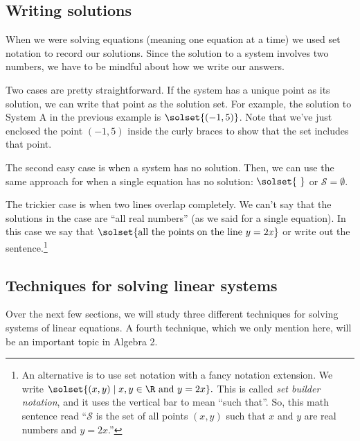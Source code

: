 \subsection{Writing solutions}

When we were solving equations (meaning one equation at a time) we used set notation to record our solutions. Since the solution to a system involves two numbers, we have to be mindful about how we write our answers.

Two cases are pretty straightforward. If the system has a unique point as its solution, we can write that point as the solution set. For example, the solution to System A in the previous example is $\solset{(-1,5)}$. Note that we've just enclosed the point $(-1,5)$ inside the curly braces to show that the set includes that point.

The second easy case is when a system has no solution. Then, we can use the same approach for when a single equation has no solution: $\solset{~}$ or $\mathcal{S}=\emptyset$.

The trickier case is when two lines overlap completely. We can't say that the solutions in the case are ``all real numbers'' (as we said for a single equation). In this case we say that $\solset{\text{all the points on the line }y=2x}$ or write out the sentence.\footnote{An alternative is to use set notation with a fancy notation extension. We write $\solset{(x,y) \mid x, y \in \R \text{ and } y=2x}.$ This is called \textit{set builder notation}, and it uses the vertical bar to mean ``such that''. So, this math sentence read ``$\mathcal{S}$ is the set of all points $(x,y)$ such that $x$ and $y$ are real numbers and $y=2x$.''}


\subsection{Techniques for solving linear systems}

Over the next few sections, we will study three different techniques for solving systems of linear equations. A fourth technique, which we only mention here, will be an important topic in Algebra 2.


